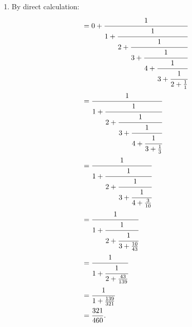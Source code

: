 \begin{solution}
\begin{enumerate}
\begin{align*}
{{{                        3 + \frac{9}{13}
                    }
                }
            } \\
            &=
            4 + \cfrac{1}{
                2 + \cfrac{1}{
                    1 + \frac{13}{48}
                }
            } \\
            &=
            4 + \cfrac{1}{
                2 + \frac{48}{61}
            } \\
            &= 4 + \frac{61}{170} \\
            &= \frac{741}{170}.
        \end{align*}
        \item By direct calculation:
        \begin{align*}
            [0;1,2,3,4,3,2,1] &= 
            0 + \cfrac{1}{
                1 + \cfrac{1}{
                    2 + \cfrac{1}{
                        3 + \cfrac{1}{
                            4 + \cfrac{1}{
                                3 + \cfrac{1}{
                                    2 + \frac{1}{1}
                                }
                            }
                        }
                    }
                }
            } \\
            &= \cfrac{1}{
                1 + \cfrac{1}{
                    2 + \cfrac{1}{
                        3 + \cfrac{1}{
                            4 + \cfrac{1}{
                                3 + \frac{1}{3}
                            }
                        }
                    }
                }
            } \\
            &= \cfrac{1}{
                1 + \cfrac{1}{
                    2 + \cfrac{1}{
                        3 + \cfrac{1}{
                            4 + \frac{3}{10}
                        }
                    }
                }
            } \\
            &= \cfrac{1}{
                1 + \cfrac{1}{
                    2 + \cfrac{1}{
                        3 + \frac{10}{43}
                    }
                }
            } \\
            &= \cfrac{1}{
                1 + \cfrac{1}{
                    2 + \frac{43}{139}
                }
            } \\
            &= \cfrac{1}{
                1 + \frac{139}{321}
            } \\
            &= \frac{321}{460}. \\
        \end{align*}
    \end{enumerate}
\end{solution}

